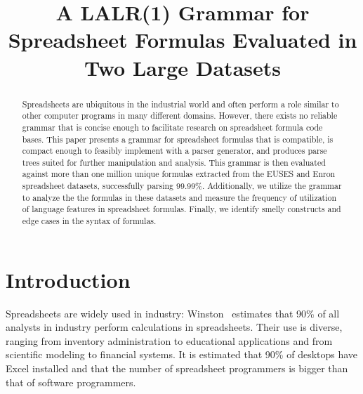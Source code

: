 \documentclass[conference]{IEEEtran}
\begin{document}
\title{A LALR(1) Grammar for Spreadsheet Formulas Evaluated in Two Large Datasets}

\author{
}
\maketitle

\begin{abstract}
Spreadsheets are ubiquitous in the industrial world and often perform a role similar to other computer programs in many different domains.
However, there exists no reliable grammar that is concise enough to facilitate research on spreadsheet formula code bases.
This paper presents a grammar for spreadsheet formulas that is compatible, is compact enough to feasibly implement with a parser generator, and produces parse trees suited for further manipulation and analysis. 
This grammar is then evaluated against more than one million unique formulas extracted from the EUSES and Enron spreadsheet datasets, successfully parsing 99.99\%.
Additionally, we utilize the grammar to analyze the the formulas in these datasets and measure the frequency of utilization of language features in spreadsheet formulas.
Finally, we identify smelly constructs and edge cases in the syntax of formulas.
\end{abstract}

\IEEEpeerreviewmaketitle


\section{Introduction}
Spreadsheets are widely used in industry: Winston~\cite{Wins2001} estimates that 90\% of all analysts in industry perform calculations in
spreadsheets. Their use is diverse, ranging from inventory administration to educational applications and from scientific
modeling to financial systems. It is estimated that 90\% of desktops have Excel installed\cite{DBLP:conf/icse/BradleyM09} and that the number of spreadsheet programmers is bigger than that of software programmers\cite{DBLP:conf/vl/ScaffidiSM05}. 
\end{document}
